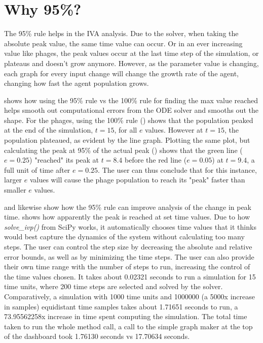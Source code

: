 \section{Why 95\%? }
\label{sec:appendixF:why_95}
The 95\% rule helps in the IVA analysis. 
Due to the solver, when taking the absolute peak value, the same time value can occur. 
Or in an ever increasing value like phages, the peak values occur at the last time step of the simulation, or plateaus and doesn't grow anymore. 
However, as the parameter value is changing, each graph for every input change will change the growth rate of the agent, changing how fast the agent population grows. 

 shows how using the 95\% rule vs the 100\% rule for finding the max value reached helps smooth out computational errors from the ODE solver and smooths out the shape. 
For the phages, using the 100\% rule () shows that the population peaked at the end of the simulation, $t=15$, for all $e$ values. 
However at $t=15$, the population plateaued, as evident by the line graph. 
Plotting the same plot, but calculating the peak at 95\% of the actual peak () shows that the green line ($e=0.25$) "reached" its peak at $t=8.4$ before the red line ($e=0.05$) at $t=9.4$, a full unit of time after $e=0.25$. 
The user can thus conclude that for this instance, larger $e$ values will cause the phage population to reach its "peak" faster than smaller $e$ values. 

 and  likewise show how the 95\% rule can improve analysis of the change in peak time. 
 shows how apparently the peak is reached at set time values. 
Due to how \textit{solve\_ivp()} from SciPy works, it automatically chooses time values that it thinks would best capture the dynamics of the system without calculating too many steps. 
The user can control the step size by decreasing the absolute and relative error bounds, as well as by minimizing the time steps. 
The user can also provide their own time range with the number of steps to run, increasing the control of the time values chosen. 
It takes about 0.02321 seconds to run a simulation for 15 time units, where 200 time steps are selected and solved by the solver. 
Comparatively, a simulation with 1000 time units and 1000000 (a 5000x increase in samples) equidistant time samples takes about 1.71651 seconds to run, a 73.95562258x increase in time spent computing the simulation. 
The total time taken to run the whole method call, a call to the simple graph maker at the top of the dashboard took 1.76130 seconds vs 17.70634 seconds. 



